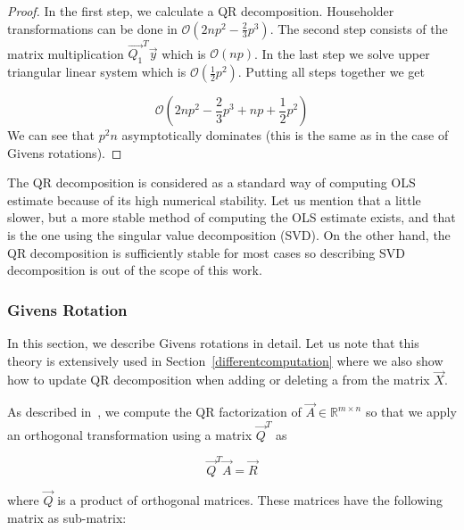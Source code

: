\begin{proof}
    In the first step, we calculate a QR decomposition. Householder transformations can be done in $\mathcal{O}(2np^2 - \frac{2}{3}p^3)$.
    The second step consists of the matrix multiplication $\vec{Q_1}^T \vec{y}$ which is $\mathcal{O}(np)$.  In the last step we solve upper triangular linear system which is $\mathcal{O}(\frac{1}{2}p^2)$.
    Putting all steps together we get  

    \begin{equation} \label{time:complexity:ols:qr:householder}
        \mathcal{O}(2np^2 - \frac{2}{3}p^3 + np + \frac{1}{2}p^2)
    \end{equation}
    We can see that $p^2n$ asymptotically dominates (this is the same as in the case of Givens rotations).
\end{proof}

The QR decomposition is considered as a standard way of computing OLS estimate because of its high numerical stability. Let us mention that a little slower, but a more stable method of computing the OLS estimate exists, and that is the one using the singular value decomposition (SVD). On the other hand, the QR decomposition is sufficiently stable for most cases so describing SVD decomposition is out of the scope of this work. 



\subsubsection*{Givens Rotation} \label{givensrotation}
In this section, we describe Givens rotations in detail. Let us note that this theory is extensively used in Section~\ref{differentcomputation} where we also show how to update QR decomposition when adding or deleting a from the matrix $\vec{X}$. 

As described in~\cite{hammarling2008updatingqr}, we compute the QR factorization of $\vec{A} \in \mathbb{R}^{m \times n}$ so that we apply an orthogonal transformation using a matrix $\vec{Q}^T$ as 

\begin{equation}
    \vec{Q}^T\vec{A} = \vec{R}
\end{equation}
 
where $\vec{Q}$ is a product of orthogonal matrices. These matrices have the following matrix as sub-matrix:

